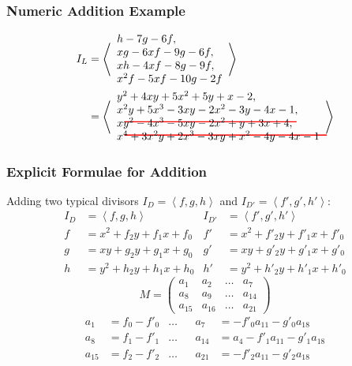 \documentclass{beamer}
\newcommand{\pid}[1]{\left\langle #1 \right\rangle}
\newcommand\sout[2][black]{
  \setbox0=\hbox{$#2$}
  \rlap{
    \raisebox{.45\ht0}{
      \textcolor{#1}{
        \rule{\wd0}{1pt}
      }
    }
  }#2
}
\begin{document}
\begin{frame}[fragile]
\frametitle{Numeric Addition Example}
  \begin{align*}
    I_L &=
      \pid{ \begin{array}{l}
        h - 7g - 6f, \\
        xg - 6xf - 9g - 6f, \\
        xh - 4xf - 8g - 9f, \\
        x^2f - 5xf - 10g - 2f
      \end{array} } \\
      &= \pid{ \begin{array}{l}
        y^2 + 4xy + 5x^2 + 5y + x - 2, \\
        x^2y + 5x^3 - 3xy - 2x^2 - 3y - 4x - 1, \\
        \sout[red]{xy^2 - 4x^3 - 5xy - 2x^2 + y + 3x + 4}, \\
        \sout[red]{x^4 + 3x^2y + 2x^3 - 3xy + x^2 - 4y - 4x - 1}
      \end{array} }
  \end{align*}
\end{frame}


\begin{frame}
\frametitle{Explicit Formulae for Addition}
  Adding two typical divisors $I_D = \pid{f,g,h}$ and $I_{D'} = \pid{f',g',h'}$:
  \begin{align*}
    I_D &= \pid{f, g, h}           & I_{D'} &= \pid{f', g', h'} \\
    f   &= x^2 + f_2y + f_1x + f_0 & f'     &= x^2 + f'_2y + f'_1x + f'_0 \\
    g   &=  xy + g_2y + g_1x + g_0 & g'     &=  xy + g'_2y + g'_1x + g'_0 \\
    h   &= y^2 + h_2y + h_1x + h_0 & h'     &= y^2 + h'_2y + h'_1x + h'_0
  \end{align*}
  \[ M = \begin{pmatrix}
    a_1 & a_2 & \dots & a_7 \\
    a_8 & a_9 & \dots & a_{14} \\
    a_{15} & a_{16} & \dots & a_{21}
  \end{pmatrix} \]
  \begin{align*}
    a_1    &= f_0 - f'_0 & \dots && a_7    &=     - f'_0a_{11} - g'_0a_{18} \\
    a_8    &= f_1 - f'_1 & \dots && a_{14} &= a_4 - f'_1a_{11} - g'_1a_{18} \\
    a_{15} &= f_2 - f'_2 & \dots && a_{21} &=     - f'_2a_{11} - g'_2a_{18}
  \end{align*}
\end{frame}
\end{document}
